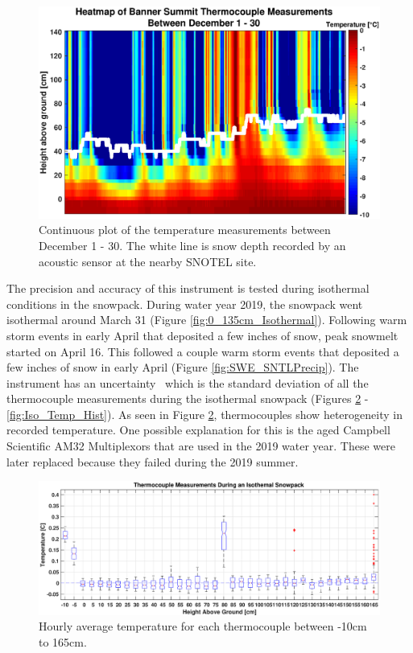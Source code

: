 \begin{figure}[H]
    \centering
    \includegraphics[width=0.9\linewidth]{figures/TCArray/Dec1_30Heatmap.eps}
    \caption{Continuous plot of the temperature measurements between December 1 - 30. The white line is  snow depth recorded by an acoustic sensor at the nearby SNOTEL site. }
    \label{fig:Dec_Jan_ImageSC}
 \end{figure}

The precision and accuracy of this instrument is tested during isothermal conditions in the snowpack. During water year 2019, the snowpack went isothermal around March 31 (Figure \ref{fig:0_135cm_Isothermal}). Following warm storm events in early April that deposited a few inches of snow, peak snowmelt started on April 16. This followed a couple warm storm events that deposited a few inches of snow in early April (Figure \ref{fig:SWE_SNTLPrecip}). The instrument has an uncertainty \isostd \ which is the standard deviation of all the thermocouple measurements during the isothermal snowpack (Figures \ref{fig:IsothermBoxplot} - \ref{fig:Iso_Temp_Hist}). As seen in Figure \ref{fig:IsothermBoxplot}, thermocouples show heterogeneity in recorded temperature. One possible explanation for this is the aged Campbell Scientific AM32 Multiplexors that are used in the 2019 water year. These were later replaced because they failed during the 2019 summer.  

\begin{figure}
    \includegraphics[width=1\linewidth]{figures/TCArray/Isothermal_Boxplot.eps}
    \caption{Hourly average temperature for each thermocouple between -10cm to 165cm.}
    \label{fig:IsothermBoxplot}
 \end{figure}

